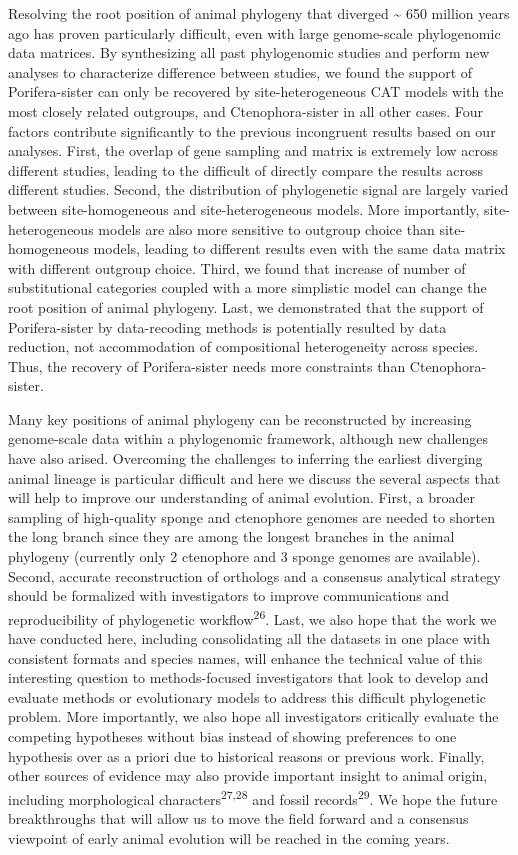 \documentclass[]{article}
\begin{document}
Resolving the root position of animal phylogeny that diverged
\textasciitilde{} 650 million years ago has proven particularly
difficult, even with large genome-scale phylogenomic data matrices. By
synthesizing all past phylogenomic studies and perform new analyses to
characterize difference between studies, we found the support of
Porifera-sister can only be recovered by site-heterogeneous CAT models
with the most closely related outgroups, and Ctenophora-sister in all
other cases. Four factors contribute significantly to the previous
incongruent results based on our analyses. First, the overlap of gene
sampling and matrix is extremely low across different studies, leading
to the difficult of directly compare the results across different
studies. Second, the distribution of phylogenetic signal are largely
varied between site-homogeneous and site-heterogeneous models. More
importantly, site-heterogeneous models are also more sensitive to
outgroup choice than site-homogeneous models, leading to different
results even with the same data matrix with different outgroup choice.
Third, we found that increase of number of substitutional categories
coupled with a more simplistic model can change the root position of
animal phylogeny. Last, we demonstrated that the support of
Porifera-sister by data-recoding methods is potentially resulted by data
reduction, not accommodation of compositional heterogeneity across
species. Thus, the recovery of Porifera-sister needs more constraints
than Ctenophora-sister.

Many key positions of animal phylogeny can be reconstructed by
increasing genome-scale data within a phylogenomic framework, although
new challenges have also arised. Overcoming the challenges to inferring
the earliest diverging animal lineage is particular difficult and here
we discuss the several aspects that will help to improve our
understanding of animal evolution. First, a broader sampling of
high-quality sponge and ctenophore genomes are needed to shorten the
long branch since they are among the longest branches in the animal
phylogeny (currently only 2 ctenophore and 3 sponge genomes are
available). Second, accurate reconstruction of orthologs and a consensus
analytical strategy should be formalized with investigators to improve
communications and reproducibility of phylogenetic
workflow\textsuperscript{26}. Last, we also hope that the work we have
conducted here, including consolidating all the datasets in one place
with consistent formats and species names, will enhance the technical
value of this interesting question to methods-focused investigators that
look to develop and evaluate methods or evolutionary models to address
this difficult phylogenetic problem. More importantly, we also hope all
investigators critically evaluate the competing hypotheses without bias
instead of showing preferences to one hypothesis over as a priori due to
historical reasons or previous work. Finally, other sources of evidence
may also provide important insight to animal origin, including
morphological characters\textsuperscript{27,28} and fossil
records\textsuperscript{29}. We hope the future breakthroughs that will
allow us to move the field forward and a consensus viewpoint of early
animal evolution will be reached in the coming years.
\end{document}
